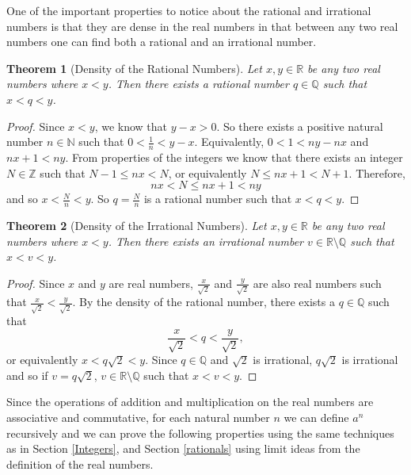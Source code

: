 \documentclass[
]{book}
\newtheorem{theorem}{Theorem}[chapter]
\theoremstyle{definition}
\theoremstyle{definition}
\theoremstyle{definition}
\theoremstyle{definition}
\theoremstyle{remark}
\begin{document}
One of the important properties to notice about the rational and irrational numbers is that they are dense in the real numbers in that between any two real numbers one can find both a rational and an irrational number.

\begin{theorem}[Density of the Rational Numbers]
Let \(x,y\in \mathbb{R}\) be any two real numbers where \(x<y\). Then there exists a rational number \(q\in \mathbb{Q}\) such that \(x<q<y\).
\end{theorem}

\begin{proof}
Since \(x<y\), we know that \(y-x>0\). So there exists a positive natural number \(n\in \mathbb{N}\) such that \(0<\frac{1}{n}<y-x\). Equivalently, \(0<1<ny-nx\) and \(nx+1<ny\). From properties of the integers we know that there exists an integer \(N\in \mathbb{Z}\) such that \(N-1\leq nx<N\), or equivalently \(N\leq nx+1 < N+1\). Therefore, \[nx<N\leq nx+1 < ny\] and so \(x<\frac{N}{n} <y\). So \(q=\frac{N}{n}\) is a rational number such that \(x<q<y\).
\end{proof}

\begin{theorem}[Density of the Irrational Numbers]
Let \(x,y\in \mathbb{R}\) be any two real numbers where \(x<y\). Then there exists an irrational number \(v\in \mathbb{R}\setminus\mathbb{Q}\) such that \(x<v<y\).
\end{theorem}

\begin{proof}
Since \(x\) and \(y\) are real numbers, \(\frac{x}{\sqrt{2}}\) and \(\frac{y}{\sqrt{2}}\) are also real numbers such that \(\frac{x}{\sqrt{2}}<\frac{y}{\sqrt{2}}\). By the density of the rational number, there exists a \(q\in \mathbb{Q}\) such that \[\frac{x}{\sqrt{2}} < q < \frac{y}{\sqrt{2}},\] or equivalently \(x<q\sqrt{2}<y\). Since \(q\in \mathbb{Q}\) and \(\sqrt{2}\) is irrational, \(q\sqrt{2}\) is irrational and so if \(v=q\sqrt{2}\), \(v\in \mathbb{R}\setminus\mathbb{Q}\) such that \(x<v<y\).
\end{proof}

Since the operations of addition and multiplication on the real numbers are associative and commutative, for each natural number \(n\) we can define \(a^n\) recursively and we can prove the following properties using the same techniques as in Section \ref{Integers}, and Section \ref{rationals} using limit ideas from the definition of the real numbers.
\end{document}
